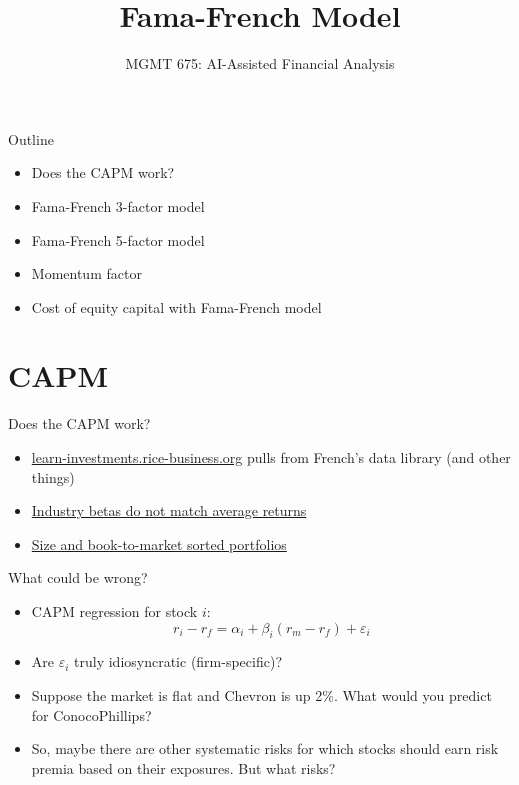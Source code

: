 \documentclass[10pt]{beamer}
\title{Fama-French Model}
\subtitle{MGMT 675: AI-Assisted Financial Analysis}
\date{}
\begin{document}
\begin{frame}[plain]
\titlepage
\end{frame}

\begin{frame}{Outline}
\begin{itemize}
\item Does the CAPM work?
\item Fama-French 3-factor model
\item Fama-French 5-factor model
\item Momentum factor
\item Cost of equity capital with Fama-French model
\end{itemize}
\end{frame}

\section{CAPM}

\begin{frame}{Does the CAPM work?}
\begin{itemize}
    \item \href{https://learn-investments.rice-business.org}{learn-investments.rice-business.org} pulls from French's data library (and other things)
    \item \href{https://learn-investments.rice-business.org/capm/sml-industries}{Industry betas do not match average returns}
    \item \href{https://learn-investments.rice-business.org/capm/two-way-capm}{Size and book-to-market sorted portfolios}
\end{itemize}
\end{frame}


\begin{frame}{What could be wrong?}
\begin{itemize}
\item CAPM regression for stock $i$:
$$r_i - r_f = \alpha_i + \beta_i (r_m - r_f) + \varepsilon_i$$
\item Are $\varepsilon_i$ truly idiosyncratic (firm-specific)? 
\item \pause Suppose the market is flat and Chevron is up 2\%.  What would you predict for ConocoPhillips?  \item \pause So, maybe there are other systematic risks for which stocks should earn risk premia based on their exposures.  But what risks?

\end{itemize}
\end{frame}
\end{document}
